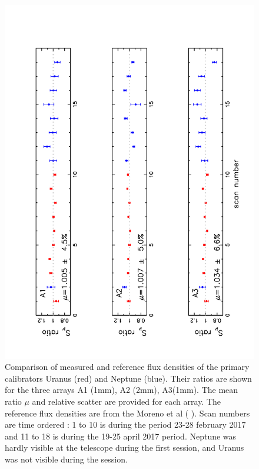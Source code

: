 \documentclass[]{aa} %
\begin{document}
\begin{figure}[h]
   \centering
    \includegraphics[angle=270,width=1.0\linewidth]{Ura_Nept_r9_10.pdf}     
    \caption{Comparison of  measured and reference flux densities of the primary calibrators Uranus (red) and Neptune (blue).
       Their ratios are shown for the three arrays A1 (1mm), A2 (2mm), A3(1mm).
      The mean ratio $\mu$ and relative scatter are provided for each array. The reference flux densities are from the Moreno et al ( ). 
      Scan numbers are time ordered : 1 to 10 is during the period 23-28 february 2017 and 11 to 18
      is during the  19-25 april 2017 period. Neptune was hardly visible at the telescope during the first session,
      and Uranus was not visible during the session.}
         \label{fig:calibaccuracy}
\end{figure}
\end{document}
